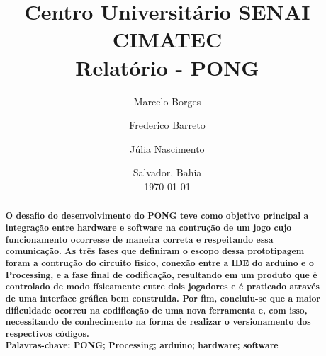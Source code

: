 \documentclass[11pt, a4paper, twocolumn]{article}
\begin{document}
\title{Centro Universitário SENAI CIMATEC\\
    \vspace{1cm}
    \textbf{Relatório - PONG \\}
}
\author[1]{Marcelo Borges}
\author[2]{Frederico Barreto}
\author[3]{Júlia Nascimento}
\date{Salvador, Bahia\\\today}
\maketitle
\begin{abstract} 
    \textbf{O desafio do desenvolvimento do PONG teve como objetivo principal a integração entre hardware e software 
    na contrução de um jogo cujo funcionamento ocorresse de maneira correta e respeitando essa comunicação. As três fases que 
    definiram o escopo dessa prototipagem foram a contrução do circuito físico, conexão entre a IDE do arduino e o Processing, e a 
    fase final de codificação, resultando em um produto que é controlado de modo físicamente entre dois jogadores e é praticado 
    através de uma interface gráfica bem construida. Por fim, concluiu-se que a maior dificuldade ocorreu na codificação de uma nova
    ferramenta e, com isso, necessitando de conhecimento na forma de realizar o versionamento dos respectivos códigos. 
    \\
    Palavras-chave: PONG; Processing; arduino; hardware; software}
\end{abstract}
\end{document}
